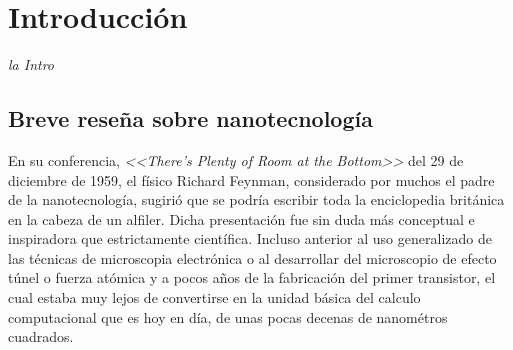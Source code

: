  \newcommand{\NoBiblioIntro}[1]{
 \ifthenelse{\equal{#1}{verdadero}}{}{}
 \NoBiblioIntro{verdadero}}


 \FormatoCapituloUnaLinea

 \chapter{Introducción}\label{chap:Introduccion}

 \thispagestyle{empty}
	
 \noindent\textit{la Intro}

 
 \vfill
 \minitoc
 \newpage

\section{Breve reseña sobre nanotecnología}

	En su conferencia, \textit{<<There's Plenty of Room at the Bottom>>} del 29 de diciembre de 1959, el físico Richard Feynman, considerado por muchos el padre de la nanotecnología, sugirió que se podría escribir toda la enciclopedia británica en la cabeza de un alfiler. Dicha presentación fue sin duda más conceptual e inspiradora que estrictamente científica\cite{Feynman1959}. Incluso anterior al uso generalizado de las técnicas de microscopia electrónica o al desarrollar del microscopio de efecto túnel o fuerza atómica y a pocos años de la fabricación del primer transistor, el cual estaba muy lejos de convertirse en la unidad básica del calculo computacional que es hoy en día, de unas pocas decenas de nanométros cuadrados. 

